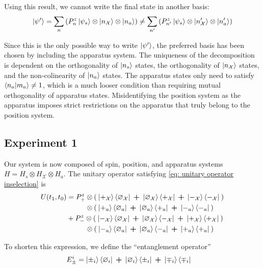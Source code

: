 Using this result, we cannot write the final state in another basis:
\begin{align}
  \ket{\psi'} = \sum_{n}\left(P^z_n\ket{\psi_s} \otimes \ket{n_\mathcal{X}} \otimes \ket{n_a} \right) \neq \sum_{n'}\left(P^z_{n'}\ket{\psi_s} \otimes \ket{n'_\mathcal{X}} \otimes \ket{n'_a} \right)
\end{align}

Since this is the only possible way to write $\ket{\psi'}$, the preferred basis has been chosen by including the apparatus system. The uniqueness of the decomposition is dependent on the orthogonality of $\ket{n_s}$ states, the orthogonality of $\ket{n_\mathcal{X}}$ states, and the non-colinearity of $\ket{n_a}$ states. The apparatus states only need to satisfy $\braket{n_a | m_a} \neq 1$, which is a much looser condition than requiring mutual orthogonality of apparatus states. Misidentifying the position system as the apparatus imposes strict restrictions on the apparatus that truly belong to the position system.

\subsection{Experiment 1}
Our system is now composed of spin, position, and apparatus systems $H = H_s \otimes H_\mathcal{X} \otimes H_a$. The unitary operator satisfying \autoref{eq: unitary operator inselection} is
\begin{align}
  U(t_1, t_0) &= P^z_+ \otimes \left(\: \ket{+_\mathcal{X}}\bra{\varnothing_\mathcal{X}} \: \bm{+} \: \ket{\varnothing_\mathcal{X}}\bra{+_\mathcal{X}} \: \bm{+} \: \ket{-_\mathcal{X}}\bra{-_\mathcal{X}} \: \right) \\ \nonumber
  &\phantom{{}=P^z_+} \otimes \left(\: \ket{+_a}\bra{\varnothing_a} \: \bm{+} \: \ket{\varnothing_a}\bra{+_a} \: \bm{+} \: \ket{-_a}\bra{-_a} \: \right)\\ \nonumber
  &+ P^z_- \otimes \left( \: \ket{-_\mathcal{X}}\bra{\varnothing_\mathcal{X}} \: \bm{+} \: \ket{\varnothing_\mathcal{X}}\bra{-_\mathcal{X}} \: \bm{+} \: \ket{+_\mathcal{X}}\bra{+_\mathcal{X}} \: \right) \\ \nonumber
 &\phantom{{}=P^z_-} \otimes \left(\: \ket{-_a}\bra{\varnothing_a} \: \bm{+} \: \ket{\varnothing_a}\bra{-_a} \: \bm{+} \: \ket{+_a}\bra{+_a} \: \right)
\end{align}

To shorten this expression, we define the ``entanglement operator''
\begin{align}
  E^i_\pm &= \ket{\pm_i}\bra{\varnothing_i} \: \bm{+} \: \ket{\varnothing_i}\bra{\pm_i} \: \bm{+} \: \ket{\mp_i}\bra{\mp_i}
\end{align}

